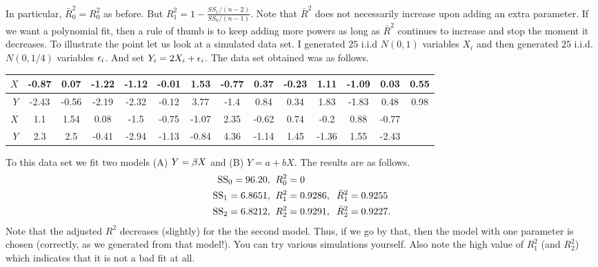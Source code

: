 \documentclass[preprint,  11pt]{amsart}
\begin{document}
In particular, $\bar{R}_{0}^{2}=R_{0}^{2}$ as before. But $R_{1}^{2}=1-\frac{SS_{1}/(n-2)}{SS_{0}/(n-1)}$. Note that $\bar{R}^{2}$ does not necessarily increase upon adding an extra parameter. If we want a polynomial fit, then a rule of thumb is to keep adding more powers as long as $\bar{R}^{2}$ continues to increase and stop the moment it decreases.
\beg To illustrate the point let us look at a simulated data set. I generated $25$ i.i.d $N(0,1)$ variables $X_{i}$ and then generated $25$ i.i.d. $N(0,1/4)$ variables $\eps_{i}$. And set $Y_{i}=2X_{i}+\eps_{i}$. The  data set obtained was as follows.
\begin{center}
\begin{tabular}{||r|c|c|c|c|c|c|c|c|c|c|c|c|c||}
\hline
$X$  & -0.87&0.07&-1.22&-1.12&-0.01&1.53&-0.77&0.37&-0.23&1.11&-1.09&0.03&0.55 \\
\hline
$Y$  & -2.43&-0.56&-2.19&-2.32&-0.12&3.77&-1.4&0.84&0.34&1.83&-1.83&0.48&0.98 \\
\hline
\hline
$X$ & 1.1&1.54&0.08&-1.5&-0.75&-1.07&2.35&-0.62&0.74&-0.2&0.88&-0.77 &\\
\hline
$Y$ & 2.3&2.5&-0.41&-2.94&-1.13&-0.84&4.36&-1.14&1.45&-1.36&1.55&-2.43  &  \\
\hline
\hline
\end{tabular}
\end{center}
To this data set we fit two models (A) $Y=\bet X$ and (B) $Y=a+bX$. The results are as follows.
\begin{align*}
\mb{SS}_{0}=96.20, &\;\;  R_{0}^{2}=0 \\
\mb{SS}_{1}=6.8651, &\;\;  R_{1}^{2}=0.9286, \hsp{2mm} \bar{R}_{1}^{2}=0.9255 \\
\mb{SS}_{2}= 6.8212, &\;\; R_{2}^{2}=0.9291, \hsp{2mm} \bar{R}_{2}^{2}=0.9227.
\end{align*}
Note that the adjusted $R^{2}$ decreases (slightly) for the the second model. Thus, if we go by that, then the model with one parameter is chosen (correctly, as we generated from that model!). You can try various simulations yourself. Also note the high value of $R_{1}^{2}$ (and $R_{2}^{2}$) which indicates that it is not a bad fit at all.
\eeg




\end{document}
